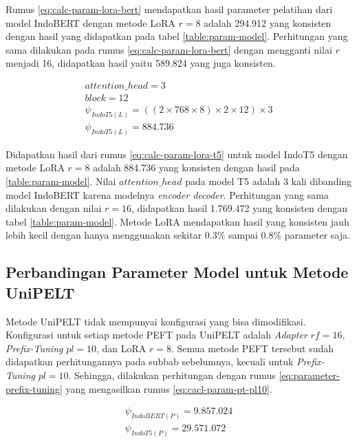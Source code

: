 Rumus \ref{eq:calc-param-lora-bert} mendapatkan hasil parameter pelatihan dari model IndoBERT dengan metode LoRA $r=8$ adalah 294.912 yang konsisten dengan hasil yang didapatkan pada tabel \ref{table:param-model}. Perhitungan yang sama dilakukan pada rumus \ref{eq:calc-param-lora-bert} dengan mengganti nilai $r$ menjadi 16, didapatkan hasil yaitu 589.824 yang juga konsisten.

\begin{equation}
    \begin{aligned}
        attention\_head = 3 \\
        block = 12 \\
        \psi_{IndoT5(L)} = ((2 \times 768 \times 8) \times 2 \times 12) \times 3 \\
        \psi_{IndoT5(L)} = 884.736
    \end{aligned}
    \label{eq:calc-param-lora-t5}
\end{equation}

Didapatkan hasil dari rumus \ref{eq:calc-param-lora-t5} untuk model IndoT5 dengan metode LoRA $r=8$ adalah 884.736 yang konsisten dengan hasil pada \ref{table:param-model}. Nilai $attention\_head$ pada model T5 adalah 3 kali dibanding model IndoBERT karena modelnya \textit{encoder decoder}. Perhitungan yang sama dilakukan dengan nilai $r=16$, didapatkan hasil 1.769.472 yang konsisten dengan tabel \ref{table:param-model}. Metode LoRA mendapatkan hasil yang konsisten jauh lebih kecil dengan hanya menggunakan sekitar 0.3\% sampai 0.8\% parameter saja.

\subsection{Perbandingan Parameter Model untuk Metode UniPELT}

Metode UniPELT tidak mempunyai konfigurasi yang bisa dimodifikasi. Konfigurasi untuk setiap metode PEFT pada UniPELT adalah \textit{Adapter} $rf=16$, \textit{Prefix-Tuning} $pl=10$, dan LoRA $r=8$. Semua metode PEFT tersebut sudah didapatkan perhitungannya pada subbab sebelumnya, kecuali untuk \textit{Prefix-Tuning} $pl=10$. Sehingga, dilakukan perhitungan dengan rumus \ref{eq:parameter-prefix-tuning} yang mengasilkan rumus \ref{eq:cacl-param-pt-pl10}.

\begin{equation}
    \begin{aligned}
        \psi_{IndoBERT(P)} = 9.857.024 \\
        \psi_{IndoT5(P)} = 29.571.072 \\
    \end{aligned}
    \label{eq:cacl-param-pt-pl10}
\end{equation}

